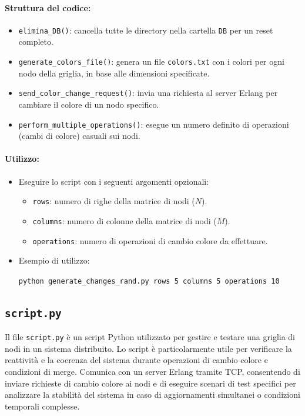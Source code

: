 \documentclass[12pt, a4paper]{report}
\begin{document}
\paragraph{Struttura del codice:}
\begin{itemize}
    \item \texttt{elimina\_DB()}: cancella tutte le directory nella cartella \texttt{DB} per un reset completo.
    \item \texttt{generate\_colors\_file()}: genera un file \texttt{colors.txt} con i colori per ogni nodo della griglia, in base alle dimensioni specificate.
    \item \texttt{send\_color\_change\_request()}: invia una richiesta al server Erlang per cambiare il colore di un nodo specifico.
    \item \texttt{perform\_multiple\_operations()}: esegue un numero definito di operazioni (cambi di colore) casuali sui nodi.
\end{itemize}

\paragraph{Utilizzo:}
\begin{itemize}
    \item Eseguire lo script con i seguenti argomenti opzionali:
        \begin{itemize}
            \item \texttt{rows}: numero di righe della matrice di nodi ($N$).
            \item \texttt{columns}: numero di colonne della matrice di nodi ($M$).
            \item \texttt{operations}: numero di operazioni di cambio colore da effettuare.
        \end{itemize}
    \item Esempio di utilizzo:
      
      \hspace{20pt}\texttt{python generate\_changes\_rand.py \-\-rows 5 \-\-columns 5 \-\-operations 10}
\end{itemize}

\subsection{\texttt{script.py}}\label{sec:script}

Il file \texttt{script.py} \`e un script Python utilizzato per gestire e testare una griglia di nodi in un sistema distribuito. Lo script \`e particolarmente utile per verificare la reattività e la coerenza del sistema durante operazioni di cambio colore e condizioni di merge. Comunica con un server Erlang tramite TCP, consentendo di inviare richieste di cambio colore ai nodi e di eseguire scenari di test specifici per analizzare la stabilità del sistema in caso di aggiornamenti simultanei o condizioni temporali complesse.
\end{document}
